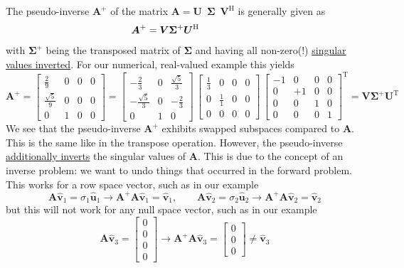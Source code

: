\documentclass[a4paper, 11pt]{scrartcl}
\begin{document}
The pseudo-inverse $\bm{A}^+$ of the matrix $\bm{A}=\bm{U}\,\,\,\bm{\Sigma}\,\,\,\bm{V}^\mathrm{H}$ is generally given as
$$\hspace{-4em}\bm{A}^+ = \bm{V} \bm{\Sigma}^+ \bm{U}^\mathrm{H}$$
with $\bm{\Sigma}^+$ being the transposed matrix of $\bm{\Sigma}$ and having all non-zero(!) \underline{singular values inverted}.
%
For our numerical, real-valued example this yields
$$
\bm{A}^+ =
\begin{bmatrix}
\frac{2}{9} & 0 & 0 & 0\\
\frac{\sqrt{5}}{9} & 0 & 0 & 0\\
0 & 1 & 0 & 0
\end{bmatrix}
=
\begin{bmatrix}
-\frac{2}{3} & 0 & \frac{\sqrt{5}}{3}\\
-\frac{\sqrt{5}}{3} & 0 & -\frac{2}{3}\\
0 & 1 & 0
\end{bmatrix}
\,
\begin{bmatrix}
\frac{1}{3} & 0 & 0 & 0\\
0 & \frac{1}{1} & 0 & 0\\
0 & 0 & 0 & 0
\end{bmatrix}
\,
\begin{bmatrix}
-1 & 0 & 0 & 0\\
0 & +1 & 0 & 0\\
0 & 0 & 1 & 0\\
0 & 0 & 0 & 1
\end{bmatrix}^\mathrm{T}
= \bm{V} \bm{\Sigma}^+ \bm{U}^\mathrm{T}
$$
We see that the pseudo-inverse $\bm{A}^+$ exhibits swapped subspaces compared to $\bm{A}$.
This is the same like in the transpose operation.
However, the pseudo-inverse \underline{additionally inverts} the singular values of $\bm{A}$.
This is due to the concept of an inverse problem: we want to undo things that occurred in the forward problem.
This works for a row space vector, such as in our example
$$
\bm{A} \hat{\bm{v}}_1 = \sigma_1 \hat{\bm{u}}_1 \rightarrow
\bm{A}^+ \bm{A} \hat{\bm{v}}_1 = \hat{\bm{v}}_1,\qquad
\bm{A} \hat{\bm{v}}_2 = \sigma_2 \hat{\bm{u}}_2 \rightarrow
\bm{A}^+ \bm{A} \hat{\bm{v}}_2 = \hat{\bm{v}}_2
$$
but this will not work for any null space vector, such as in our example
$$
\bm{A} \hat{\bm{v}}_3 =
\begin{bmatrix}
0\\0\\0\\0
\end{bmatrix}
 \rightarrow
\bm{A}^+ \bm{A} \hat{\bm{v}}_3 =
\begin{bmatrix}
0\\0\\0
\end{bmatrix} \neq \hat{\bm{v}}_3
$$
\end{document}
